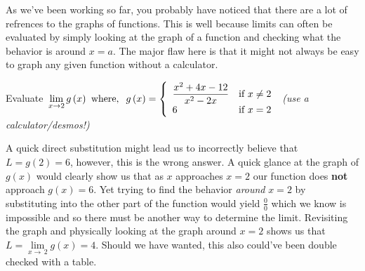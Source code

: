 \documentclass[addpoints]{exam}
\begin{document}
\newpage

\begin{tcolorbox}[breakable, title=GRAPHICALLY, colframe=black, sharp corners, colback=white, colbacktitle=white, coltitle=black]
	As we've been working so far, you probably have noticed that there are a lot of refrences to the graphs of functions. This is well because limits can often be evaluated by simply looking at the graph of a function and checking what the behavior is around $x=a$. The major flaw here is that it might not always be easy to graph any given function without a calculator.
\end{tcolorbox}

\begin{questions}
	\question Evaluate $\displaystyle\,\mathop {\lim }\limits_{x \to 2} g\left( x \right)\hspace{0.05in}{\mbox{where,}}\hspace{0.1in}g\left( x \right) = \left\{ \begin{array}{ll}\displaystyle \frac{{{x^2} + 4x - 12}}{{{x^2} - 2x}} & {\mbox{if }}x \ne 2\\ 6 & {\mbox{if }}x = 2\end{array} \right.$ \small\textit{(use a calculator/desmos!)}\normalsize
	\begin{solution}[2.5in]
		\begin{minipage}{0.45\linewidth}
			A quick direct substitution might lead us to incorrectly believe that $L=g(2)=6$, however, this is the wrong answer. A quick glance at the graph of $g(x)$ would clearly show us that as $x$ approaches $x=2$ our function does \textbf{not} approach $g(x)=6$. Yet trying to find the behavior \textit{around} $x=2$ by substituting into the other part of the function would yield $\frac{0}{0}$ which we know is impossible and so there must be another way to determine the limit. Revisiting the graph and physically looking at the graph around $x=2$ shows us that $L=\lim\limits_{x\to\,2} g(x) = 4$. Should we have wanted, this also could've been double checked with a table.
		\end{minipage}
		\hfill
		\begin{minipage}{0.45\linewidth}
		\end{minipage}
	\end{solution}
\end{questions}
\end{document}
